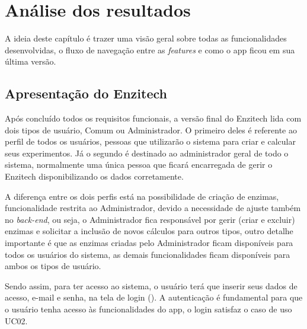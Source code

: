 \chapter{Análise dos resultados}\label{ch:resultados}
A ideia deste capítulo é trazer uma visão geral sobre todas as funcionalidades desenvolvidas, o fluxo de navegação entre as \textit{features} e como o \ac{app} ficou em sua última versão.

\section{Apresentação do Enzitech}
Após concluído todos os requisitos funcionais, a versão final do Enzitech lida com dois tipos de usuário, Comum ou Administrador. O primeiro deles é referente ao perfil de todos os usuários, pessoas que utilizarão o sistema para criar e calcular seus experimentos. Já o segundo é destinado ao administrador geral de todo o sistema, normalmente uma única pessoa que ficará encarregada de gerir o Enzitech disponibilizando os dados corretamente. 

A diferença entre os dois perfis está na possibilidade de criação de enzimas, funcionalidade restrita ao Administrador, devido a necessidade de ajuste também no \textit{back-end}, ou seja, o Administrador fica responsável por gerir (criar e excluir) enzimas e solicitar a inclusão de novos cálculos para outros tipos, outro detalhe importante é que as enzimas criadas pelo Administrador ficam disponíveis para todos os usuários do sistema, as demais funcionalidades ficam disponíveis para ambos os tipos de usuário. 

Sendo assim, para ter acesso ao sistema, o usuário terá que inserir seus dados de acesso, e-mail e senha, na tela de login (). A autenticação é fundamental para que o usuário tenha acesso às funcionalidades do \ac{app}, o login satisfaz o caso de uso UC02.


